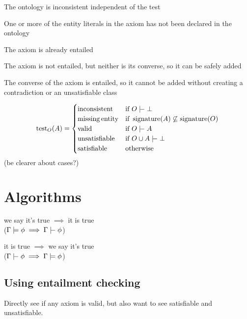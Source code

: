 \documentclass[11pt]{article}
\newcommand{\union}{\cup}
\newcommand{\sementails}{\mathrel{|}\joinrel\mkern-.5mu\mathrel{-}}
\newcommand{\synentails}{\mathrel{|}\joinrel\mathrel{=}}
\DeclareMathOperator{\signature}{signature}
\begin{document}
\begin{description}[noitemsep]
  \item[inconsistent] The ontology is inconsistent independent of the test
  \item[missing entity] One or more of the entity literals in the axiom has not been declared in the ontology
  \item[valid] The axiom is already entailed
  \item[satisfiable] The axiom is not entailed, but neither is its converse, so it can be safely added
  \item[unsatisfiable] The converse of the axiom is entailed, so it cannot be added without creating a contradiction or an unsatisfiable class
\end{description}

\[
  \mathrm{test}_O(A) =
  \begin{cases}
    \mathrm{inconsistent} &
      \mbox{if } O \sementails \bot \\
    \mathrm{missing\,entity} &
      \mbox{if } \signature(A) \not\subseteq \signature(O) \\
    \mathrm{valid} &
      \mbox{if } O \sementails A \\
    \mathrm{unsatisfiable} &
      \mbox{if } O \union A \sementails \bot \\
    \mathrm{satisfiable} &
      \mbox{otherwise}
  \end{cases}
\]
(be clearer about cases?)

\section{Algorithms}

\begin{description}[noitemsep]
  \item[Soundness] we say it's true $\implies$ it is true \\ ($\Gamma \synentails \phi \implies \Gamma \sementails \phi$)
  \item[Completeness] it is true $\implies$ we say it's true \\ ($\Gamma \sementails \phi \implies \Gamma \synentails \phi$)
\end{description}

\subsection{Using entailment checking}

Directly see if any axiom is valid, but also want to see satisfiable and unsatisfiable.
\end{document}
